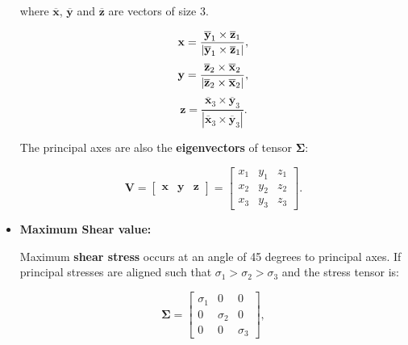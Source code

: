 \begin{itemize}
        where $\overline{\mathbf{x}}$, $\overline{\mathbf{y}}$ and $\overline{\mathbf{z}}$ are vectors of size 3.

        \begin{equation}
              \mathbf{x} = \frac{\overline{\mathbf{y}}_{1} \times \overline{\mathbf{z}}_{1}}
              {|\overline{\mathbf{y}}_{1} \times \overline{\mathbf{z}}_{1}|}\\
        ,\end{equation}
        \begin{equation}
              \mathbf{y} = \frac{\overline{\mathbf{z}}_{2} \times \overline{\mathbf{x}}_{2}}
              {|\overline{\mathbf{z}}_{2} \times \overline{\mathbf{x}}_{2}|}\\
        ,\end{equation}
        \begin{equation}
              \mathbf{z} = \frac{\overline{\mathbf{x}}_{3} \times \overline{\mathbf{y}}_{3}}
              {|\overline{\mathbf{x}}_{3} \times \overline{\mathbf{y}}_{3}|}
        .\end{equation}

        The principal axes are also the \textbf{eigenvectors} of tensor $\mathbf{\Sigma}$:

        \begin{equation}
            \mathbf{V} = \begin{bmatrix}
                \mathbf{x} & \mathbf{y} & \mathbf{z}
            \end{bmatrix} = \begin{bmatrix}
                x_1 & y_1 & z_1 \\
                x_2 & y_2 & z_2 \\
                x_3 & y_3 & z_3
            \end{bmatrix}
        .\end{equation}

    \item \textbf{Maximum Shear value:}


        Maximum \textbf{shear stress} occurs at an angle of 45 degrees to principal axes.
        If principal stresses are aligned such that $\sigma_1 > \sigma_2 > \sigma_3$
        and the stress tensor is:

        \begin{equation}
            \mathbf{\Sigma} = \begin{bmatrix}
                \sigma_1 & 0 & 0 \\
                0 & \sigma_2 & 0 \\
                0 & 0 & \sigma_3
            \end{bmatrix}
        ,\end{equation}


\end{itemize}
